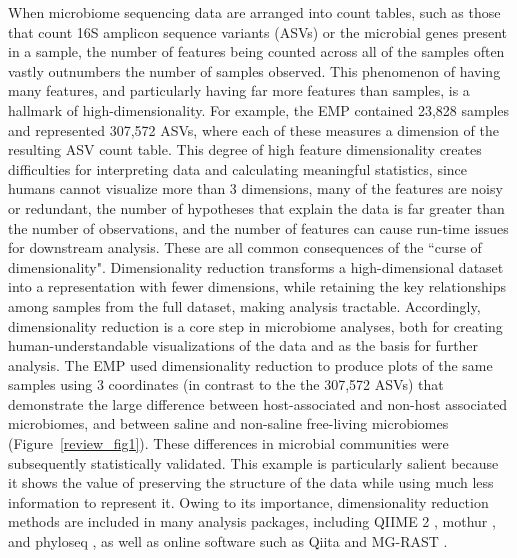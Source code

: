When microbiome sequencing data are arranged into count tables, such as those that count 16S amplicon sequence variants (ASVs) or the microbial genes present in a sample, the number of features being counted across all of the samples often vastly outnumbers the number of samples observed. This phenomenon of having many features, and particularly having far more features than samples, is a hallmark of  high-dimensionality. For example, the EMP  \cite{Thompson2017-pu} contained 23,828 samples and represented 307,572 ASVs, where each of these measures a dimension of the resulting ASV count table. This degree of high feature dimensionality creates difficulties for interpreting data and calculating meaningful statistics, since humans cannot visualize more than 3 dimensions, many of the features are noisy or redundant, the number of hypotheses that explain the data is far greater than the number of observations, and the number of features can cause run-time issues for downstream analysis. These are all common consequences of the ``curse of dimensionality". Dimensionality reduction transforms a high-dimensional dataset into a representation with fewer dimensions, while retaining the key relationships among samples from the full dataset, making analysis tractable. Accordingly, dimensionality reduction is a core step in microbiome analyses, both for creating human-understandable visualizations of the data and as the basis for further analysis.  The EMP used dimensionality reduction   to produce plots of the same samples using 3 coordinates (in contrast to the the 307,572 ASVs) that demonstrate the large difference between host-associated and non-host associated microbiomes, and between saline and non-saline free-living microbiomes (Figure~\ref{review_fig1}). These differences in microbial communities were subsequently statistically validated. This example is particularly salient because it shows the value of preserving the structure of the data while using much less information to represent it. Owing to its importance, dimensionality reduction methods are included in many analysis packages, including QIIME 2 \cite{Bolyen2019-fq}, mothur \cite{Schloss2009-zs}, and phyloseq \cite{McMurdie2013-kz}, as well as online software such as Qiita \cite{Gonzalez2018-ez} and MG-RAST \cite{Keegan2016-vk}.  

